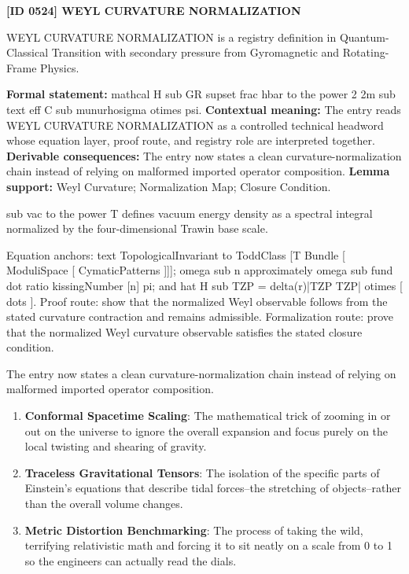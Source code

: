 \clearpage
\noindent\textbf{[ID 0524] WEYL CURVATURE NORMALIZATION}\par
\vspace{0.35em}
\begingroup\small
{}
WEYL CURVATURE NORMALIZATION is a registry definition in Quantum-Classical Transition with secondary pressure from Gyromagnetic and Rotating-Frame Physics.

\begingroup\footnotesize\setlength{\emergencystretch}{3em}\sloppy
\textbf{Formal statement:} mathcal H sub GR supset frac hbar to the power 2 2m sub text eff C sub munurhosigma otimes psi. \textbf{Contextual meaning:} The entry reads WEYL CURVATURE NORMALIZATION as a controlled technical headword whose equation layer, proof route, and registry role are interpreted together. \textbf{Derivable consequences:} The entry now states a clean curvature-normalization chain instead of relying on malformed imported operator composition. \textbf{Lemma support:} Weyl Curvature; Normalization Map; Closure Condition.\par
\endgroup

sub vac to the power T defines vacuum energy density as a spectral integral normalized by the four-dimensional Trawin base scale.

Equation anchors: text TopologicalInvariant to ToddClass [T Bundle [ ModuliSpace [ CymaticPatterns ]]]; omega sub n approximately omega sub fund dot ratio kissingNumber [n] pi; and hat H sub TZP = delta(r)|TZP TZP| otimes [ dots ]. Proof route: show that the normalized Weyl observable follows from the stated curvature contraction and remains admissible. Formalization route: prove that the normalized Weyl curvature observable satisfies the stated closure condition.

The entry now states a clean curvature-normalization chain instead of relying on malformed imported operator composition.
\endgroup

\begin{enumerate}[leftmargin=1.6em,itemsep=6pt,topsep=4pt]
\item \textbf{Conformal Spacetime Scaling}: The mathematical trick of zooming in or out on the universe to ignore the overall expansion and focus purely on the local twisting and shearing of gravity.
\item \textbf{Traceless Gravitational Tensors}: The isolation of the specific parts of Einstein's equations that describe tidal forces--the stretching of objects--rather than the overall volume changes.
\item \textbf{Metric Distortion Benchmarking}: The process of taking the wild, terrifying relativistic math and forcing it to sit neatly on a scale from 0 to 1 so the engineers can actually read the dials.
\end{enumerate}

